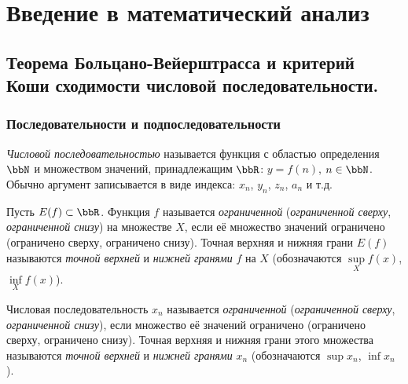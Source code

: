 \part{Введение в математический анализ}
\chapter{Теорема Больцано-Вейерштрасса и критерий Коши сходимости числовой последовательности.}

\section{Последовательности и подпоследовательности}


\begin{defn} \label{df2:2}
\textit{Числовой последовательностью} называется функция с областью определения $\bbN$ и множеством значений, принадлежащим $\bbR$: $y = f(n)$, $n \in \bbN$. Обычно аргумент записывается в виде индекса: $x_n$, $y_n$, $z_n$, $a_n$ и т.д.
\end{defn}


\begin{defn} \label{df2:3}
Пусть $E(f) \subset \bbR$. Функция $f$ называется \textit{ограниченной} (\textit{ограниченной сверху}, \textit{ограниченной снизу}) на множестве $X$, если её множество значений ограничено (ограничено сверху, ограничено снизу). Точная верхняя и нижняя грани $E(f)$ называются \textit{точной верхней} и \textit{нижней гранями} $f$ на $X$ (обозначаются $\sup\limits_{X} f(x)$, $\inf\limits_{X} f(x)$).

Числовая последовательность $x_n$ называется \textit{ограниченной} (\textit{ограниченной сверху}, \textit{ограниченной снизу}), если множество её значений ограничено (ограничено сверху, ограничено снизу). Точная верхняя и нижняя грани этого множества называются \textit{точной верхней} и \textit{нижней гранями} $x_n$ (обозначаются $\sup x_n$, $\inf x_n$).
\end{defn}

